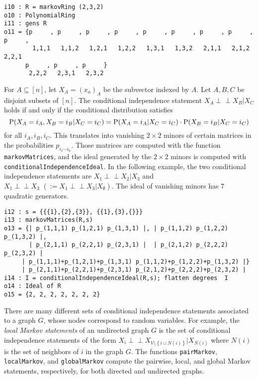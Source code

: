 \documentclass[letterpaper]{article}
\theoremstyle{plain}
\theoremstyle{definition}
\def\ci{\perp\!\!\!\perp}
\begin{document}
\begin{verbatim}
i10 : R = markovRing (2,3,2)
o10 : PolynomialRing
i11 : gens R
o11 = {p     , p     , p     , p     , p     , p     , p     , p     , p     ,
        1,1,1   1,1,2   1,2,1   1,2,2   1,3,1   1,3,2   2,1,1   2,1,2   2,2,1 
      p     , p     , p     }
       2,2,2   2,3,1   2,3,2
\end{verbatim}

For $A \subseteq [n]$, let $X_{A} = (x_{a})_{A}$ be the subvector
indexed by $A$.  Let $A,B,C$ be disjoint subsets of $[n]$.  
The conditional independence statement
$X_{A} \ci X_{B} | X_{C}$ holds if and only if the conditional
distribution satisfies
$$
{\rm P}(X_{A} = i_{A}, X_{B} = i_{B} | X_{C} = i_{C}) =
{\rm P}(X_{A} = i_{A} | X_{C} = i_{C})\cdot {\rm P}( X_{B} = i_{B} | X_{C} = i_{C})$$
for all $i_{A}, i_{B}, i_{C}$.   This translates into vanishing
$2\!\times\! 2$ minors of certain matrices in the probabilities 
$p_{i_{1}\cdots i_{n}}$.  Those matrices are computed with the 
function {\tt markovMatrices},
and the ideal generated by the $2 \!\times\! 2$ minors is computed with 
{\tt conditionalIndependenceIdeal}.  In the following example,
the two conditional independence statements are $X_{1} \ci X_{2} | X_{3}$
and $X_{1} \ci X_{3} \, \,  (:=  X_{1} \ci X_{3} | X_{\emptyset})$. 
The ideal of vanishing minors has $7$ quadratic generators. 

\begin{verbatim}
i12 : s = {{{1},{2},{3}}, {{1},{3},{}}}
i13 : markovMatrices(R,s)
o13 = {| p_(1,1,1) p_(1,2,1) p_(1,3,1) |, | p_(1,1,2) p_(1,2,2) p_(1,3,2) |, 
       | p_(2,1,1) p_(2,2,1) p_(2,3,1) |  | p_(2,1,2) p_(2,2,2) p_(2,3,2) |  
     | p_(1,1,1)+p_(1,2,1)+p_(1,3,1) p_(1,1,2)+p_(1,2,2)+p_(1,3,2) |}
     | p_(2,1,1)+p_(2,2,1)+p_(2,3,1) p_(2,1,2)+p_(2,2,2)+p_(2,3,2) |
i14 : I = conditionalIndependenceIdeal(R,s); flatten degrees  I 
o14 : Ideal of R
o15 = {2, 2, 2, 2, 2, 2, 2}
\end{verbatim}

There are many different sets of conditional independence statements
associated to a graph $G$, whose nodes correspond to random variables.
For example, the \emph{local Markov statements} of an undirected graph $G$
is the set of conditional independence statements of the form
$X_{i} \ci X_{V \setminus \left\{i \cup N(i)\right\}} | X_{N(i)}$ where $N(i)$ is the set of neighbors of $i$ in the graph $G$.
The functions {\tt pairMarkov}, {\tt localMarkov}, and {\tt globalMarkov}
compute the pairwise, local, and global Markov statements, respectively, 
for both directed and undirected graphs.
\end{document}
